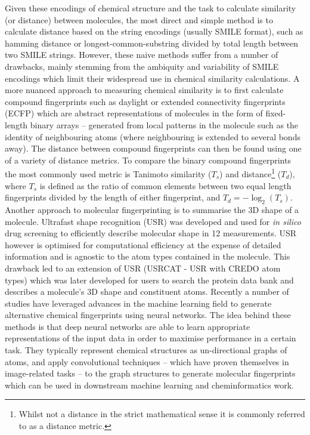 \documentclass[a4paper,11pt,twoside,openright]{scrbook}
\begin{document}
Given these encodings of chemical structure and the task to calculate similarity (or distance) between molecules, the most direct and simple method is to calculate distance based on the string encodings (usually SMILE format), such as hamming distance or longest-common-substring divided by total length between two SMILE strings.\cite{Ozturk2016}
However, these naive methods  suffer from a number of drawbacks, mainly stemming from the ambiquity and variability of SMILE encodings which limit their widespread use in chemical similarity calculations.
A more nuanced approach to measuring chemical similarity is to first calculate  compound fingerprints such as daylight or extended connectivity fingerprints (ECFP) \cite{Rogers2010} which are abstract representations of molecules in the form of fixed-length binary arrays -- generated from local patterns in the molecule such as the identity of neighbouring atoms (where neighbouring is extended to several bonds away).
The distance between compound fingerprints can then be found using one of a variety of distance metrics.
To compare the binary compound fingerprints the most commonly used metric is Tanimoto similarity ($T_s$) and distance\footnote{Whilst not a distance in the  strict mathematical sense it is commonly referred to as a distance metric.} ($T_d$), where $T_s$ is defined as the ratio of common elements between two equal length fingerprints divided by the length of either fingerprint, and $T_d = -\log_2(T_s)$.
Another approach to molecular fingerprinting is to summarise the 3D shape of a molecule.
Ultrafast shape recognition (USR) was developed and used for \textit{in silico} drug screening to efficiently describe molecular shape in 12 measurements.
USR however is optimised for computational efficiency at the expense of detailed information and is agnostic to the atom types contained in the molecule.
This drawback led to an extension of USR (USRCAT - USR with CREDO atom types) which was later developed for users to search the protein data bank and describes a molecule's 3D shape and constituent atoms. \cite{Schreyer2012}
Recently a number of studies have leveraged advances in the machine learning field to generate alternative chemical fingerprints using neural networks. \cite{Kearnes2016a,Feinberg2018,Ma2018,Liu2018}
The idea behind these methods is that deep neural networks are able to learn appropriate representations of the input data in order to maximise performance in a certain task.
They typically represent chemical structures as un-directional graphs of atoms, and apply convolutional techniques -- which have proven themselves in image-related tasks -- to the graph structures to generate molecular fingerprints which can be used in downstream machine learning and cheminformatics work.
\end{document}
